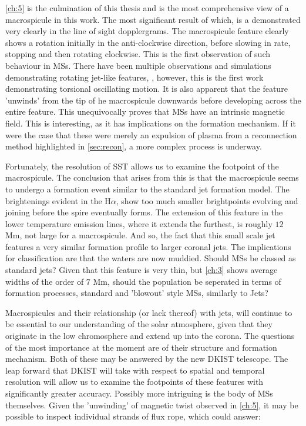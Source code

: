\cref{ch:5} is the culmination of this thesis and is the most comprehensive view of a macrospicule in this work.
The most significant result of which, is a demonstrated very clearly in the line of sight dopplergrams.
The macrospicule feature clearly shows a rotation initially in the anti-clockwise direction, before slowing in rate, stopping and then rotating clockwise.
This is the first observation of such behaviour in MSs.
There have been multiple observations and simulations demonstrating rotating jet-like features, \cite{Kamio2010, Curdt2011, Majarska2011}, however, this is the first work demonstrating torsional oscillating motion.
It is also apparent that the feature 'unwinds' from the tip of he macrospicule downwards before developing across the entire feature.  
This unequivocally proves that MSs have an intrinsic magnetic field.
This is interesting, as it has implications on the formation mechanism.
If it were the case that these were merely an expulsion of plasma from a reconnection method highlighted in \cref{sec:recon}, a more complex process is underway.

Fortunately, the resolution of SST allows us to examine the footpoint of the macrospicule.
The conclusion that arises from this is that the macrospicule seems to undergo a formation event similar to the \cite{Shibata1992} standard jet formation model.
The brightenings evident in the H$\alpha$, show too much smaller brightpoints evolving and joining before the spire eventually forms.
The extension of this feature in the lower temperature emission lines, where it extends the furthest, is roughly $12$ Mm, not large for a macrospicule.
And so, the fact that this small scale jet features a very similar formation profile to larger coronal jets.
The implications for classification are that the waters are now muddied.
Should MSs be classed as standard jets?
Given that this feature is very thin, but \cref{ch:3} shows average widths of the order of $7$ Mm, should the population be seperated in terms of formation processes, standard and 'blowout' style MSs, similarly to Jets?

Macrospicules and their relationship (or lack thereof) with jets, will continue to be essential to our understanding of the solar atmosphere, given that they originate in the low chromosphere and extend up into the corona.
The questions of the most importance at the moment are of their structure and formation mechanism.
Both of these may be answered by the new DKIST telescope.
The leap forward that DKIST will take with respect to spatial and temporal resolution will allow us to examine the footpoints of these features with significantly greater accuracy.
Possibly more intriguing is the body of MSs themselves.
Given the 'unwinding' of magnetic twist observed in \cref{ch:5}, it may be possible to inspect individual strands of flux rope, which could answer:

